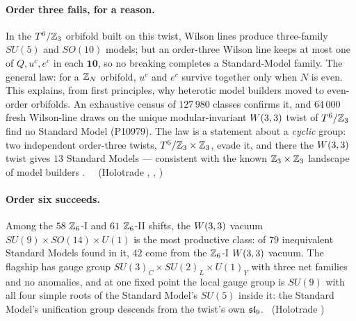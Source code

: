 \paragraph{Order three fails, for a reason.}
In the $T^6/\mathbb{Z}_3$ orbifold built on this twist, Wilson lines produce three-family $SU(5)$
and $SO(10)$ models; but an order-three Wilson line keeps at most one of $Q,u^c,e^c$ in each
$\mathbf{10}$, so no breaking completes a Standard-Model family. The general law: for a
$\mathbb{Z}_N$ orbifold, $u^c$ and $e^c$ survive together only when $N$ is even. This explains, from
first principles, why heterotic model builders moved to even-order orbifolds. An exhaustive
census of $127\,980$ classes confirms it, and $64\,000$ fresh Wilson-line draws on the unique
modular-invariant $W(3,3)$ twist of $T^6/\mathbb{Z}_3$ find no Standard Model (P10979). The law is a statement
about a \emph{cyclic} group: two independent order-three twists, $T^6/\mathbb{Z}_3\times\mathbb{Z}_3$, evade it, and
there the $W(3,3)$ twist gives $13$ Standard Models --- consistent with the known $\mathbb{Z}_3\times\mathbb{Z}_3$ landscape
of model builders \cite{OlguinTrejo2018}. \tierT\ \tierC\ (Holotrade ,
, )

\paragraph{Order six succeeds.}
Among the $58$ $\mathbb{Z}_6$-I and $61$ $\mathbb{Z}_6$-II shifts, the $W(3,3)$ vacuum
$SU(9)\times SO(14)\times U(1)$ is the most productive class: of $79$ inequivalent Standard
Models found in it, $42$ come from the $\mathbb{Z}_6$-I $W(3,3)$ vacuum. The flagship has gauge group
$SU(3)_C\times SU(2)_L\times U(1)_Y$ with three net families and no anomalies, and at one
fixed point the local gauge group is $SU(9)$ with all four simple roots of the
Standard Model's $SU(5)$ inside it: the Standard Model's unification group descends from the
twist's own $\mathfrak{sl}_9$. \tierC\ (Holotrade )

